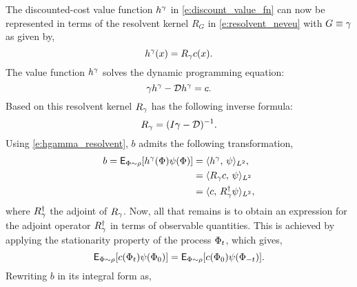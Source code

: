 The discounted-cost value function $h^\gamma$ in \eqref{e:discount_value_fn} can now be represented in terms of the resolvent kernel $R_G$ in \eqref{e:resolvent_neveu} with $G \equiv \gamma$ as given by,
\begin{equation}
h^\discount(x) = R_\discount c(x).
\label{e:hgamma_resolvent}
\end{equation}
The value function $h^\gamma$ solves the dynamic programming equation:
\[
\gamma h^\gamma - {\cal D} h^\gamma =  c.
\]
Based on this resolvent kernel $R_\gamma$ has the following inverse formula:
\[
R_\gamma = ( I \gamma - {\cal D})^{-1}.
\]
Using \eqref{e:hgamma_resolvent}, $b$ admits the following transformation,
\[
\begin{aligned}
b = {\sf E}_{\Phi \sim \rho} [h^\gamma(\Phi) \psi(\Phi) ] &= \langle h^\gamma, \, \psi \rangle_{L^2},\\
& = \langle R_\gamma c, \,\psi \rangle_{L^2} \\
& = \langle c,\, R^\dagger_\gamma \psi \rangle_{L^2},
\end{aligned}
\]
where $R^\dagger_\gamma$ the adjoint of $R_\gamma$. Now, all that remains is to obtain an expression for the adjoint operator $R^\dagger_\gamma$ in terms of observable quantities. This is achieved by applying the stationarity property of the process $\Phi_t$, which gives, 
\[
{\sf E}_{\Phi \sim \rho}[c(\Phi_t) \psi(\Phi_0)] = {\sf E}_{\Phi \sim \rho} [c(\Phi_0) \psi(\Phi_{-t})].
\] 
Rewriting $b$ in its integral form as,
